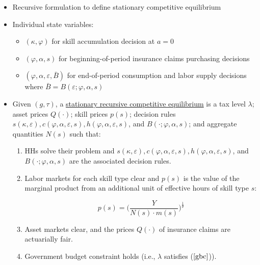 \documentclass{article}
\begin{document}
\begin{itemize}

\item Recursive formulation to define stationary competitive equilibrium

\item Individual state variables:

\begin{itemize}

\item $(\kappa, \varphi)$ for skill accumulation decision at $a = 0$

\item $(\varphi, \alpha, s)$ for beginning-of-period insurance claims purchasing decisions

\item $(\varphi, \alpha, \varepsilon, \bar B)$ for end-of-period consumption and labor supply decisions where $\bar B = B(\varepsilon; \varphi, \alpha, s)$

\end{itemize}

\item Given $(g, \tau)$, a \underline{stationary recursive competitive equilibrium} is a tax level $\lambda$; asset prices $Q(\cdot)$; skill prices $p(s)$; decision rules $s(\kappa, \varepsilon), c(\varphi, \alpha, \varepsilon, s), h(\varphi, \alpha, \varepsilon, s)$, and $B(\cdot; \varphi, \alpha, s)$; and aggregate quantities $N(s)$ such that:

\begin{enumerate}

\item HHs solve their problem and $s(\kappa, \varepsilon), c(\varphi, \alpha, \varepsilon, s), h(\varphi, \alpha, \varepsilon, s)$, and $B(\cdot; \varphi, \alpha, s)$ are the associated decision rules.

\item Labor markets for each skill type clear and $p(s)$ is the value of the marginal product from an additional unit of effective hours of skill type $s$:

$$
p(s) = \Bigg( \frac{Y}{N(s)\cdot m(s)} \Bigg)^{\frac{1}{\theta}}
$$

\item Asset markets clear, and the prices $Q(\cdot)$ of insurance claims are actuarially fair.

\item Government budget constraint holds (i.e., $\lambda$ satisfies ($\ref{gbc}$)).

\end{enumerate}

\end{itemize}
\end{document}
